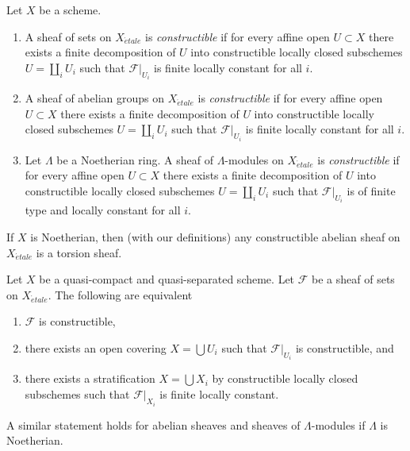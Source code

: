 \begin{definition}
\label{definition-constructible}
Let $X$ be a scheme.
\begin{enumerate}
\item A sheaf of sets on $X_{\acute{e}tale}$ is {\it constructible}
if for every affine open $U \subset X$ there exists a finite decomposition
of $U$ into constructible locally closed subschemes $U = \coprod_i U_i$
such that $\mathcal{F}|_{U_i}$ is finite locally constant for all $i$.
\item A sheaf of abelian groups on $X_{\acute{e}tale}$ is {\it constructible}
if for every affine open $U \subset X$ there exists a finite decomposition
of $U$ into constructible locally closed subschemes $U = \coprod_i U_i$
such that $\mathcal{F}|_{U_i}$ is finite locally constant for all $i$.
\item Let $\Lambda$ be a Noetherian ring. A sheaf of $\Lambda$-modules
on $X_{\acute{e}tale}$ is {\it constructible} if for every affine open
$U \subset X$ there exists a finite decomposition
of $U$ into constructible locally closed subschemes
$U = \coprod_i U_i$ such that
$\mathcal{F}|_{U_i}$ is of finite type and locally constant for all $i$.
\end{enumerate}
\end{definition}

\begin{remark}
\label{remark-noetherian-constructible-torsion}
If $X$ is Noetherian, then (with our definitions)
any constructible abelian sheaf on $X_{\acute{e}tale}$ is a torsion sheaf.
\end{remark}

\begin{lemma}
\label{lemma-constructible-quasi-compact-quasi-separated}
Let $X$ be a quasi-compact and quasi-separated scheme. Let $\mathcal{F}$
be a sheaf of sets on $X_{\acute{e}tale}$. The following are equivalent
\begin{enumerate}
\item $\mathcal{F}$ is constructible,
\item there exists an open covering $X = \bigcup U_i$ such that
$\mathcal{F}|_{U_i}$ is constructible, and
\item there exists a stratification $X = \bigcup X_i$ by constructible
locally closed subschemes such that $\mathcal{F}|_{X_i}$ is finite
locally constant.
\end{enumerate}
A similar statement holds for abelian sheaves and sheaves of
$\Lambda$-modules if $\Lambda$ is Noetherian.
\end{lemma}

